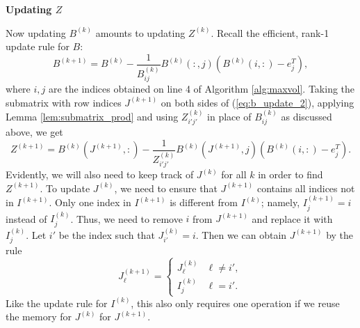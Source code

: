 \documentclass{article}
\begin{document}
	\textbf{Updating $Z$}
	
	Now updating $B^{(k)}$ amounts to updating $Z^{(k)}$. Recall the efficient, rank-1 update rule for $B$:
	\begin{equation}
		\label{eq:b_update_2}
		B^{(k+1)} = B^{(k)} - \frac{1}{B^{(k)}_{ij}}B^{(k)}(:,j)\left(B^{(k)}(i,:) - e_j^T\right),
	\end{equation}
	where $i,j$ are the indices obtained on line 4 of Algorithm \ref{alg:maxvol}. Taking the submatrix with row indices $J^{(k+1)}$ on both sides of (\ref{eq:b_update_2}), applying Lemma \ref{lem:submatrix_prod} and using $Z^{(k)}_{i'j'}$ in place of $B^{(k)}_{ij}$ as discussed above, we get
	\begin{equation}
		\label{eq:z_update_partial}
		Z^{(k+1)} = B^{(k)}\left(J^{(k+1)}, :\right) - \frac{1}{Z^{(k)}_{i'j'}}B^{(k)}\left(J^{(k+1)}, j\right)\left(B^{(k)}(i,:) - e_j^T\right).
	\end{equation}
	Evidently, we will also need to keep track of $J^{(k)}$ for all $k$ in order to find $Z^{(k+1)}$. To update $J^{(k)}$, we need to ensure that $J^{(k+1)}$ contains all indices not in $I^{(k+1)}$. Only one index in $I^{(k+1)}$ is different from $I^{(k)}$; namely, $I^{(k+1)}_j = i$ instead of $I^{(k)}_j$. Thus, we need to remove $i$ from $J^{(k+1)}$ and replace it with $I^{(k)}_j$. Let $i'$ be the index such that $J^{(k)}_{i'} = i$. Then we can obtain $J^{(k+1)}$ by the rule
	\begin{equation}
		J^{(k+1)}_\ell = \begin{cases}
			J^{(k)}_\ell & \ell \ne i', \\
			I^{(k)}_j & \ell = i'.
		\end{cases}
	\end{equation}
	Like the update rule for $I^{(k)}$, this also only requires one operation if we reuse the memory for $J^{(k)}$ for $J^{(k+1)}$. 
	
\end{document}
